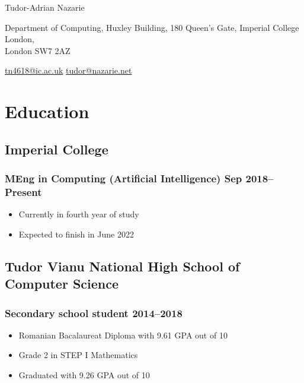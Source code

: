 \documentclass[a4paper]{article}
\begin{document}
\begin{center}
	{\huge\sffamily Tudor-Adrian Nazarie}

	\vspace{4pt}

	Department of Computing, Huxley Building, 180 Queen's Gate, Imperial
	College London,\\ London SW7 2AZ

	\vspace{4pt}

	\href{mailto:tn4618@ic.ac.uk}{tn4618@ic.ac.uk}
	\href{mailto:tudor@nazarie.net}{tudor@nazarie.net}


	\vspace{-12pt}
\end{center}

\section*{Education}
\subsection*{Imperial College}
\subsubsection*{MEng in Computing (Artificial Intelligence) \hfill Sep 2018--Present}
\begin{itemize}
	\item Currently in fourth year of study
	\item Expected to finish in June 2022
\end{itemize}

\subsection*{Tudor Vianu National High School of Computer Science}
\subsubsection*{Secondary school student \hfill 2014--2018}
\begin{itemize}
	\item Romanian Bacalaureat Diploma with 9.61 GPA out of 10
	\item Grade 2 in STEP I Mathematics
	\item Graduated with 9.26 GPA out of 10
\end{itemize}
\end{document}
